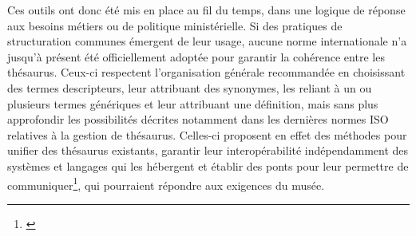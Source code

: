 \bigskip

Ces outils ont donc été mis en place au fil du temps, dans une logique de réponse aux besoins métiers ou de politique ministérielle. Si des pratiques de structuration communes émergent de leur usage, aucune norme internationale n’a jusqu’à présent été officiellement adoptée pour garantir la cohérence entre les thésaurus. Ceux-ci respectent l'organisation générale recommandée en choisissant des termes descripteurs, leur attribuant des synonymes, les reliant à un ou plusieurs termes génériques et leur attribuant une définition, mais sans plus approfondir les possibilités décrites notamment dans les dernières normes ISO relatives à la gestion de thésaurus. Celles-ci proposent en effet des méthodes pour unifier des thésaurus existants, garantir leur interopérabilité indépendamment des systèmes et langages qui les hébergent et établir des ponts pour leur permettre de communiquer\footnote{\cite{chichereauNormesConceptionGestion2007}}, qui pourraient répondre aux exigences du musée.